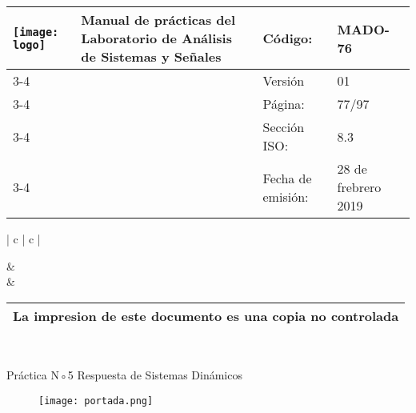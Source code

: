 
	\centering
	\begin{tabular}{ |	p{30 mm}|	p{61 mm}	|	p{33mm}	| p{43mm}	| } 
		\hline
		
		
		\multirow{4}{30mm}{\centering \texttt{[image: logo]}} &
		\multirow{4}{61mm}{\centering \textbf{ \textbf{Manual de prácticas del Laboratorio de Análisis de Sistemas y Señales}}}    & Código: & MADO-76 \\
		\cline{3-4}
		& &  Versión & 01 \\
		\cline{3-4}
		& & Página: & 77/97 \\ \cline{3-4}
		& & Sección ISO: & 8.3 \\ \cline{3-4}
		& & Fecha de emisión: & 28 de frebrero 2019 \\
		\hline
	\end{tabular}
\begin{tabular}{ |	c |	c	| } 
	
	 &
	   \\
	& \\ \hline
\end{tabular}
\begin{tabular}{|p{180mm}|}
	\multirow{1}{180mm}{ \centering La impresion de este documento es una copia no controlada }  \\ \hline \end{tabular} \\

\vspace{1cm}


{\centering \LARGE Práctica N◦5 Respuesta de Sistemas Dinámicos }

\vspace{1.5cm}

\begin{figure}[!h]
	\centering
	\texttt{[image: portada.png]}
\end{figure}

\hspace{2cm}

